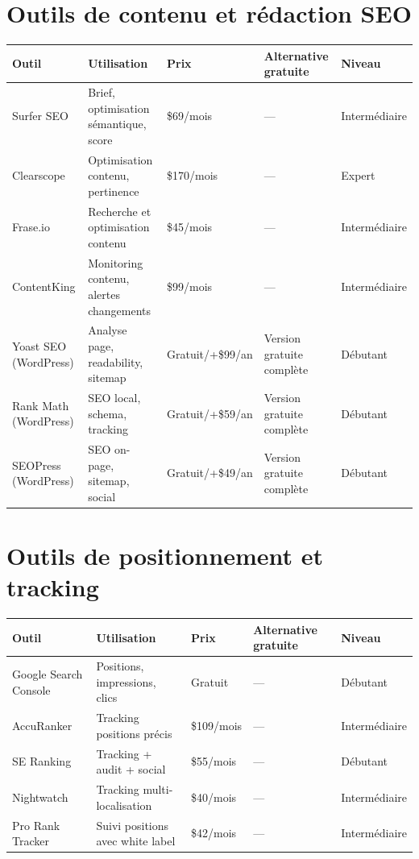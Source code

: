 \documentclass[12pt,a4paper,twoside]{report}
\begin{document}
\section*{Outils de contenu et rédaction SEO}

\begin{center}
\begin{tabularx}{\textwidth}{|p{3cm}|X|p{2cm}|p{2.5cm}|p{1.8cm}|}
\hline
\textbf{Outil} & \textbf{Utilisation} & \textbf{Prix} & \textbf{Alternative gratuite} & \textbf{Niveau} \\
\hline
Surfer SEO & Brief, optimisation sémantique, score & \$69/mois & — & Intermédiaire \\
\hline
Clearscope & Optimisation contenu, pertinence & \$170/mois & — & Expert \\
\hline
Frase.io & Recherche et optimisation contenu & \$45/mois & — & Intermédiaire \\
\hline
ContentKing & Monitoring contenu, alertes changements & \$99/mois & — & Intermédiaire \\
\hline
Yoast SEO (WordPress) & Analyse page, readability, sitemap & Gratuit/+\$99/an & Version gratuite complète & Débutant \\
\hline
Rank Math (WordPress) & SEO local, schema, tracking & Gratuit/+\$59/an & Version gratuite complète & Débutant \\
\hline
SEOPress (WordPress) & SEO on-page, sitemap, social & Gratuit/+\$49/an & Version gratuite complète & Débutant \\
\hline
\bottomrule
\end{tabularx}
\end{center}

\section*{Outils de positionnement et tracking}

\begin{center}
\begin{tabularx}{\textwidth}{|p{3cm}|X|p{2cm}|p{2.5cm}|p{1.8cm}|}
\hline
\textbf{Outil} & \textbf{Utilisation} & \textbf{Prix} & \textbf{Alternative gratuite} & \textbf{Niveau} \\
\hline
Google Search Console & Positions, impressions, clics & Gratuit & — & Débutant \\
\hline
AccuRanker & Tracking positions précis & \$109/mois & — & Intermédiaire \\
\hline
SE Ranking & Tracking + audit + social & \$55/mois & — & Débutant \\
\hline
Nightwatch & Tracking multi-localisation & \$40/mois & — & Intermédiaire \\
\hline
Pro Rank Tracker & Suivi positions avec white label & \$42/mois & — & Intermédiaire \\
\hline
\bottomrule
\end{tabularx}
\end{center}
\end{document}
